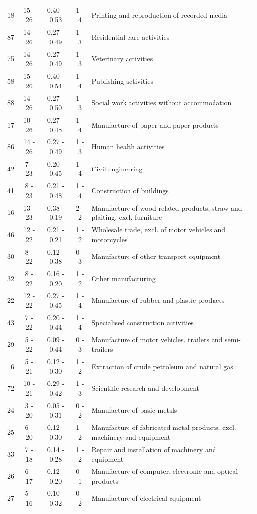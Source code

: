 \begin{table}[htbp]
\begin{threeparttable}
\begin{tabular}{r|c|c|c|l}
18&	15 - 26&	0.40 - 0.53&	1 - 4&	Printing and reproduction of recorded media\\
87&	14 - 26&	0.27 - 0.49&	1 - 3&	Residential care activities\\
75&	14 - 26&	0.27 - 0.49&	1 - 3&	Veterinary activities\\
58&	15 - 26&	0.40 - 0.54&	1 - 4&	Publishing activities\\
88&	14 - 26&	0.27 - 0.50&	1 - 3&	Social work activities without accommodation\\
17&	10 - 26&	0.27 - 0.48&	1 - 4&	Manufacture of paper and paper products\\
86&	14 - 26&	0.27 - 0.49&	1 - 3&	Human health activities\\
42&	7 - 23&	0.20 - 0.45&	1 - 4&	Civil engineering\\
41&	8 - 23&	0.21 - 0.48&	1 - 4&	Construction of buildings\\
16&	13 - 23&	0.38 - 0.19&	2 - 2&	Manufacture of wood related products, straw and plaiting, excl. furniture\\
46&	12 - 22&	0.21 - 0.21&	1 - 2&	Wholesale trade, excl. of motor vehicles and motorcycles\\
30&	8 - 22&	0.12 - 0.38&	0 - 3&	Manufacture of other transport equipment\\
32&	8 - 22&	0.16 - 0.20&	1 - 2&	Other manufacturing\\
22&	12 - 22&	0.27 - 0.45&	1 - 4&	Manufacture of rubber and plastic products\\
43&	7 - 22&	0.20 - 0.44&	1 - 4&	Specialised construction activities\\
29&	5 - 22&	0.09 - 0.44&	0 - 3&	Manufacture of motor vehicles, trailers and semi-trailers\\
6&	5 - 21&	0.12 - 0.30&	1 - 2&	Extraction of crude petroleum and natural gas\\
72&	10 - 21&	0.29 - 0.42&	1 - 3&	Scientific research and development \\
24&	3 - 20&	0.05 - 0.31&	0 - 2&	Manufacture of basic metals\\
25&	6 - 20&	0.12 - 0.30&	1 - 2&	Manufacture of fabricated metal products, excl. machinery and equipment\\
33&	7 - 18&	0.14 - 0.28&	1 - 2&	Repair and installation of machinery and equipment\\
26&	6 - 17&	0.12 - 0.20&	0 - 1&	Manufacture of computer, electronic and optical products\\
27&	5 - 16&	0.10 - 0.32&	0 - 2&	Manufacture of electrical equipment\\

\end{tabular}
\end{threeparttable}
\end{table}

